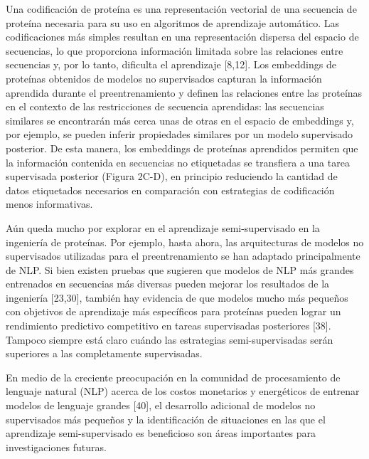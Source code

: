 \documentclass[12pt]{article}
\begin{document}
Una codificación de proteína es una representación vectorial de una secuencia de proteína necesaria para su uso en algoritmos de aprendizaje automático. Las codificaciones más simples resultan en una representación dispersa del espacio de secuencias, lo que proporciona información limitada sobre las relaciones entre secuencias y, por lo tanto, dificulta el aprendizaje [8,12]. Los embeddings de proteínas obtenidos de modelos no supervisados capturan la información aprendida durante el preentrenamiento y definen las relaciones entre las proteínas en el contexto de las restricciones de secuencia aprendidas: las secuencias similares se encontrarán más cerca unas de otras en el espacio de embeddings y, por ejemplo, se pueden inferir propiedades similares por un modelo supervisado posterior. De esta manera, los embeddings de proteínas aprendidos permiten que la información contenida en secuencias no etiquetadas se transfiera a una tarea supervisada posterior (Figura 2C-D), en principio reduciendo la cantidad de datos etiquetados necesarios en comparación con estrategias de codificación menos informativas.

Aún queda mucho por explorar en el aprendizaje semi-supervisado en la ingeniería de proteínas. Por ejemplo, hasta ahora, las arquitecturas de modelos no supervisados utilizadas para el preentrenamiento se han adaptado principalmente de NLP. Si bien existen pruebas que sugieren que modelos de NLP más grandes entrenados en secuencias más diversas pueden mejorar los resultados de la ingeniería [23,30], también hay evidencia de que modelos mucho más pequeños con objetivos de aprendizaje más específicos para proteínas pueden lograr un rendimiento predictivo competitivo en tareas supervisadas posteriores [38]. Tampoco siempre está claro cuándo las estrategias semi-supervisadas serán superiores a las completamente supervisadas.


En medio de la creciente preocupación en la comunidad de procesamiento de lenguaje natural (NLP) acerca de los costos monetarios y energéticos de entrenar modelos de lenguaje grandes [40], el desarrollo adicional de modelos no supervisados más pequeños y la identificación de situaciones en las que el aprendizaje semi-supervisado es beneficioso son áreas importantes para investigaciones futuras.
\end{document}
